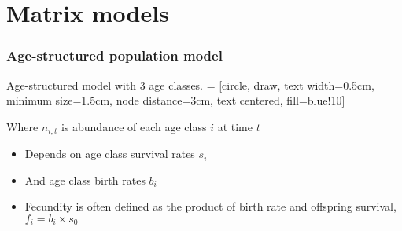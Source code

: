 \documentclass[color=usenames,dvipsnames]{beamer}\usepackage[]{graphicx}\usepackage[]{color}
\begin{document}
\section{Matrix models}

\begin{frame}
  \frametitle{Age-structured population model}
  Age-structured model with 3 age classes.
  \vfill
   = [circle, draw, text width=0.5cm, minimum size=1.5cm,
  node distance=3cm, text centered, fill=blue!10]
  \pause
  \begin{center}
  \end{center}
  \pause
  {Where $n_{i,t}$ is abundance of each age class $i$ at time $t$}
  \begin{itemize}[<+->]
    \item Depends on age class survival rates $s_{i}$
    \item And age class birth rates $b_{i}$
    \item Fecundity is often defined as the product of birth rate and offspring survival, $f_i = b_i
      \times s_0$
  \end{itemize}
\end{frame}
\end{document}
